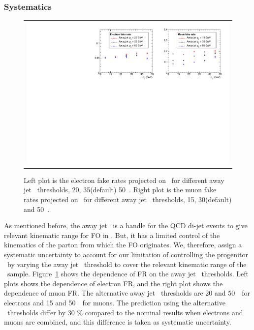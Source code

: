 \subsubsection{Systematics}
%
\begin{figure}[htp] 
\centering 
\begin{tabular}{c} 
\includegraphics[width=1.0\textwidth]{figures/FR_jetpt_variation.pdf}
\end{tabular} 
\caption{Left plot is the electron fake rates projected on \pt\ for 
different away jet \pt\ thresholds, 20, 35(default) 50~\GeV. 
Right plot is the muon fake rates projected on \pt\ for
different away jet \pt\ thresholds, 15, 30(default) and 50~\GeV.} 
\label{fig:FR_jetpt_variation} 
\end{figure} 
As mentioned before, the away jet \pt\ is a handle for the QCD di-jet events 
to give relevant kinematic range for FO in \Wjets.  
But, it has a limited control of the kinematics of the parton
from which the FO originates. 
We, therefore, assign a systematic uncertainty 
to account for our limitation of controlling the progenitor \pt\ 
by varying the away jet \pt\ threshold
to cover the relevant kinematic range of the \Wjets\ sample.
Figure~\ref{fig:FR_jetpt_variation} shows the dependence of FR on the 
away jet \pt\ thresholds. Left plots shows the dependence of electron 
FR, and the right plot shows the dependence of muon FR. 
The alternative away jet \pt\ thresholds are 20 and 50~\GeV\ for electrons 
and 15 and 50~\GeV\ for muons. The prediction using the alternative \pt\ thresholds
differ by 30 \% compared to the nominal results when electrons and muons are combined, 
and this difference is taken as systematic uncertainty. 
